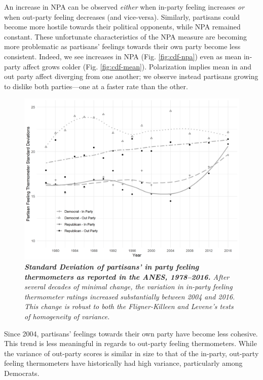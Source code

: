 \documentclass[12pt]{article}
\begin{document}
 An increase in NPA can be observed \textit{either} when in-party feeling increases \textit{or} when out-party feeling decreases (and vice-versa). Similarly, partisans could become more hostile towards their political opponents, while NPA remained constant. These unfortunate characteristics of the NPA measure are becoming more problematic as partisans' feelings towards their own party become less consistent. Indeed, we see increases in NPA (Fig. \ref{fig:cdf-npa}) even as mean in-party affect grows colder (Fig. \ref{fig:cdf-mean}).   Polarization implies mean in and out party affect diverging from one another; we observe instead partisans growing to dislike both parties---one at a faster rate than the other. 

\begin{figure}[H]
\center\includegraphics[width=5in]{cdf-sd.png}
\caption{\label{fig:cdf-sd} \textit{\textbf{Standard Deviation of partisans' in party feeling thermometers as reported in the ANES, 1978--2016.} After several decades of minimal change, the variation in in-party feeling thermometer ratings increased substantially between 2004 and 2016. This change is robust to both the Fligner-Killeen and Levene's tests of homogeneity of variance.}}
\end{figure}

Since 2004, partisans' feelings towards their own party have become less cohesive. This trend is less meaningful in regards to out-party feeling thermometers. While  the variance of out-party scores is similar in size to that of the in-party, out-party feeling thermometers have historically had high variance, particularly among Democrats.
\end{document}
